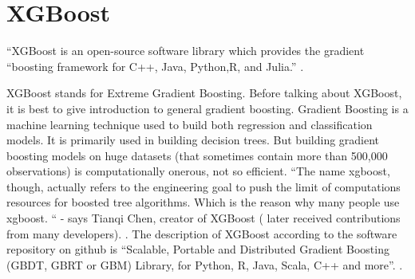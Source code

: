 \section{XGBoost} 

“XGBoost  is an open-source software library which provides the gradient
“boosting framework for C++, Java, Python,R, and Julia.” 
\cite{hid-sp18-401-XGBoost-wiki}.

XGBoost stands for Extreme Gradient Boosting. Before talking about XGBoost, it
is best to give introduction to general gradient boosting. Gradient Boosting is
a machine learning technique used to build both regression and classification
models. It is primarily used in building decision trees. But building gradient
boosting models on huge datasets (that sometimes contain more than 500,000
observations) is computationally onerous, not so efficient.  “The name xgboost,
though, actually refers to the engineering goal to push the limit of
computations resources for boosted tree algorithms. Which is the reason why many
people use xgboost. “ - says Tianqi Chen, creator of XGBoost ( later received
contributions from many developers). \cite{hid-sp18-401-XGBoost-gen}. The
description of XGBoost according to the software repository on github is
“Scalable, Portable and Distributed Gradient Boosting (GBDT, GBRT or GBM)
Library, for Python, R, Java, Scala, C++ and more”. 
\cite{hid-sp18-401-XGBoost-git}.
